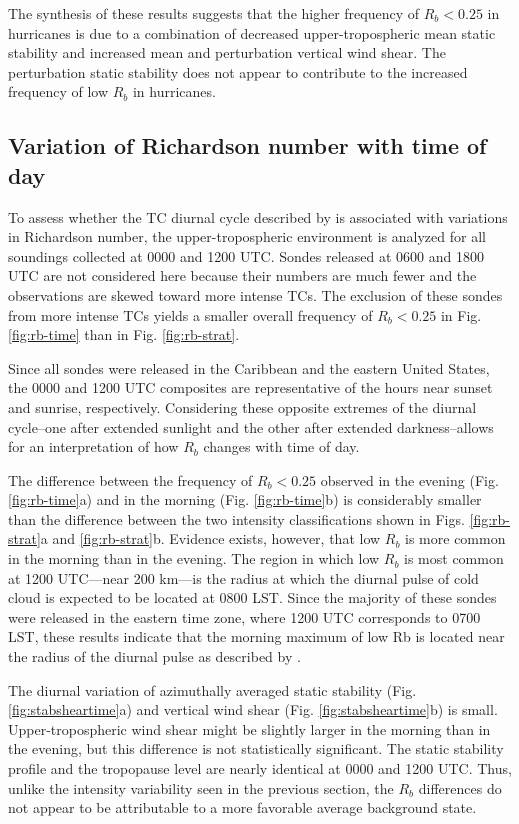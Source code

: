 The synthesis of these results suggests that the higher frequency of $R_b < 0.25$ in hurricanes is due to a combination of decreased upper-tropospheric mean static stability and increased mean and perturbation vertical wind shear.
The perturbation static stability does not appear to contribute to the increased frequency of low $R_b$ in hurricanes.

\subsection{Variation of Richardson number with time of day}

To assess whether the TC diurnal cycle described by \cite{Dunionetal2014} is associated with variations in Richardson number, the upper-tropospheric environment is analyzed for all soundings collected at 0000 and 1200 UTC.
Sondes released at 0600 and 1800 UTC are not considered here because their numbers are much fewer and the observations are skewed toward more intense TCs.
The exclusion of these sondes from more intense TCs yields a smaller overall frequency of $R_b < 0.25$ in Fig. \ref{fig:rb-time} than in Fig. \ref{fig:rb-strat}.

Since all sondes were released in the Caribbean and the eastern United States, the 0000 and 1200 UTC composites are representative of the hours near sunset and sunrise, respectively.
Considering these opposite extremes of the diurnal cycle--one after extended sunlight and the other after extended darkness--allows for an interpretation of how $R_b$ changes with time of day.

The difference between the frequency of $R_b < 0.25$ observed in the evening (Fig. \ref{fig:rb-time}a) and in the morning (Fig. \ref{fig:rb-time}b) is considerably smaller than the difference between the two intensity classifications shown in Figs. \ref{fig:rb-strat}a and \ref{fig:rb-strat}b.
Evidence exists, however, that low $R_b$ is more common in the morning than in the evening.
The region in which low $R_b$ is most common at 1200 UTC---near 200 km---is the radius at which the diurnal pulse of cold cloud is expected to be located at 0800 LST.
Since the majority of these sondes were released in the eastern time zone, where 1200 UTC corresponds to 0700 LST, these results indicate that the morning maximum of low Rb is located near the radius of the diurnal pulse as described by \cite{Dunionetal2014}.

The diurnal variation of azimuthally averaged static stability (Fig. \ref{fig:stabsheartime}a) and vertical wind shear (Fig. \ref{fig:stabsheartime}b) is small.
Upper-tropospheric wind shear might be slightly larger in the morning than in the evening, but this difference is not statistically significant.
The static stability profile and the tropopause level are nearly identical at 0000 and 1200 UTC.
Thus, unlike the intensity variability seen in the previous section, the $R_b$ differences do not appear to be attributable to a more favorable average background state.

